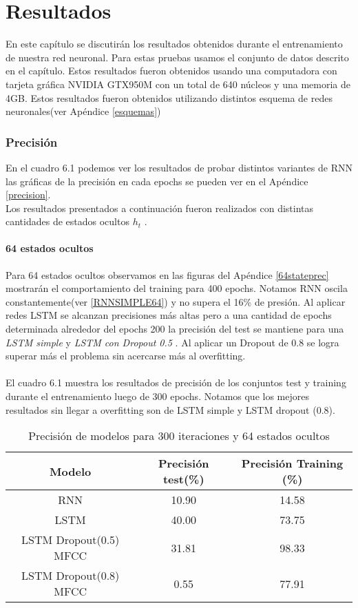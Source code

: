 \chapter{Resultados}
En este capítulo se discutirán los resultados obtenidos durante el entrenamiento de nuestra red neuronal.
Para estas pruebas usamos el conjunto de datos descrito en el capítulo. Estos resultados fueron
obtenidos usando una computadora con tarjeta gráfica NVIDIA GTX950M con
un total de 640 núcleos y una memoria de 4GB.
Estos resultados fueron obtenidos utilizando distintos esquema de redes neuronales(ver Apéndice \ref{esquemas})
\subsection{Precisión}
En el cuadro 6.1 podemos ver los resultados de probar distintos variantes de RNN las gráficas de la precisión en cada epochs se pueden ver en el Apéndice \ref{precision}.\\ Los resultados presentados a continuación fueron realizados con distintas cantidades de estados ocultos $h_{t}$ .
\subsubsection{64 estados ocultos}
Para 64 estados ocultos observamos en las figuras del Apéndice \ref{64stateprec} mostrarán el comportamiento del training para 400 epochs. Notamos RNN oscila constantemente(ver \ref{RNNSIMPLE64}) y no supera el 16\% de presión. Al aplicar redes LSTM se alcanzan precisiones más altas pero a una cantidad de epochs determinada alrededor del epochs 200 la precisión del test se mantiene para una \textit{LSTM simple} y \textit{LSTM con Dropout 0.5} . Al aplicar un Dropout de 0.8 se logra superar más el problema sin acercarse más al overfitting.\\ \\
El cuadro 6.1 muestra los resultados de precisión de los conjuntos test y training durante el entrenamiento luego de 300 epochs. Notamos que los mejores resultados sin llegar a overfitting son de LSTM simple y LSTM dropout (0.8).
\begin{table}[H]
	\centering
	\begin{tabular}{|c|c|c|}
		\hline
		\rowcolor{Gray}  Modelo & Precisión test(\%) & Precisión Training (\%)\\ \hline
		RNN &      10.90   &                14.58  \\ \hline
		
		LSTM &        40.00 &          73.75       \\ \hline
		
		LSTM Dropout(0.5) MFCC&  31.81    &     98.33       \\ \hline
		
		LSTM Dropout(0.8) MFCC&	0.55		&	77.91		\\ \hline
		
	\end{tabular}
	\caption{Precisión de modelos para 300 iteraciones y 64 estados ocultos}
\end{table}


